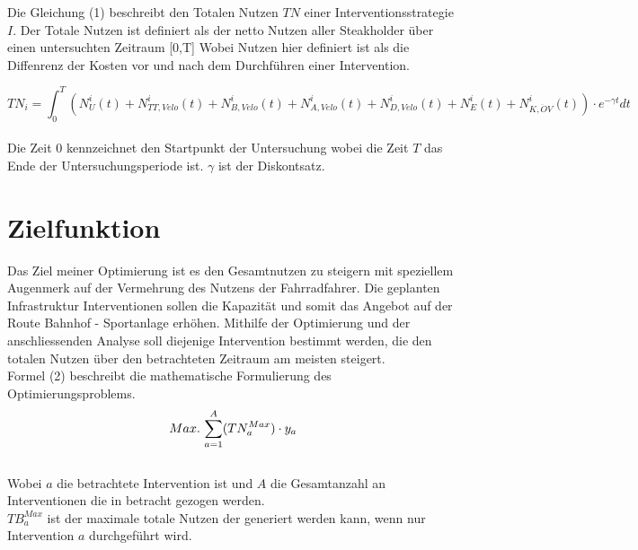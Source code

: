 Die Gleichung (1) beschreibt den Totalen Nutzen $TN$ einer Interventionsstrategie $I$. Der Totale Nutzen ist definiert als der netto Nutzen aller Steakholder über einen untersuchten Zeitraum [0,T] \newline
Wobei Nutzen hier definiert ist als die Diffenrenz der Kosten vor und nach dem Durchführen einer Intervention. 

\begin{equation}
    TN_{i} = \int_{0}^{T} (N_{U}^i(t) + N_{TT,Velo}^i(t) + N_{B,Velo}^i(t) +
    N_{A,Velo}^i(t) + N_{D,Velo}^i(t) + N_E^i(t) + N_{K,\ddot{O}V}^i(t)) \cdot e^{-\gamma t} dt
\end{equation} \\ [2ex]

Die Zeit $0$ kennzeichnet den Startpunkt der Untersuchung wobei die Zeit $T$ das Ende der Untersuchungsperiode ist. $\gamma$ ist der Diskontsatz.


\newpage





 
\section{\textbf{{Zielfunktion}}}

Das Ziel meiner Optimierung ist es den Gesamtnutzen zu steigern mit speziellem Augenmerk auf der Vermehrung des Nutzens der Fahrradfahrer. \newline
Die geplanten Infrastruktur Interventionen sollen die Kapazität und somit das Angebot auf der Route Bahnhof - Sportanlage erhöhen. \newline
Mithilfe der Optimierung und der anschliessenden Analyse soll diejenige Intervention bestimmt werden, die den totalen Nutzen über den betrachteten Zeitraum am meisten steigert. \\ [4ex]




Formel (2) beschreibt die mathematische Formulierung des Optimierungsproblems.
\\ [2ex]
\begin{equation}
    Max.\thinspace\sum_{a=1}^{A} (TN_{a}^{Max}) \cdot {y_a}
\end{equation} \\ [2ex]

Wobei ${a}$ die betrachtete Intervention ist und ${A}$ die Gesamtanzahl an Interventionen die in betracht gezogen werden. \\ [2ex]
$TB_a^{Max}$ ist der maximale totale Nutzen der generiert werden kann, wenn nur Intervention ${a}$ durchgeführt wird.



%

